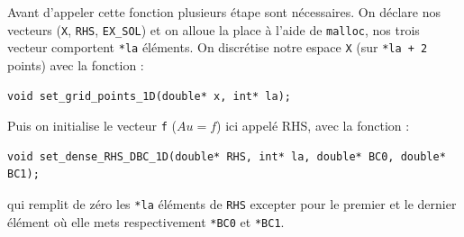 \documentclass{article}
\begin{document}
Avant d'appeler cette fonction plusieurs étape sont nécessaires. On déclare nos vecteurs (\texttt{X}, \texttt{RHS}, \texttt{EX\_SOL}) et on alloue la place à l'aide de \texttt{malloc}, nos trois vecteur comportent \texttt{*la} éléments. On discrétise notre espace \texttt{X} (sur \texttt{*la + 2} points) avec la fonction :
\begin{scriptsize}
\begin{verbatim}
void set_grid_points_1D(double* x, int* la);
\end{verbatim}
\end{scriptsize}
Puis on initialise le vecteur \texttt{f} ($Au = f$) ici appelé RHS, avec la fonction : \begin{scriptsize}
\begin{verbatim}
void set_dense_RHS_DBC_1D(double* RHS, int* la, double* BC0, double* BC1);
\end{verbatim}
\end{scriptsize}
qui remplit de zéro les \texttt{*la} éléments de \texttt{RHS} excepter pour le premier et le dernier élément où elle mets respectivement \texttt{*BC0} et \texttt{*BC1}.
\end{document}
